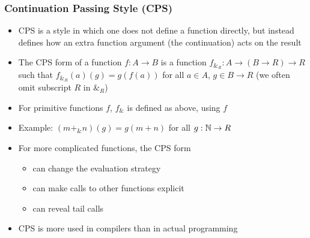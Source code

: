 \documentclass[handout]{beamer}
\begin{document}
\frame
  {   
    \frametitle{Continuation Passing Style (CPS)}\label{Mon5:CPS}

 \begin{itemize}[<+->]
\item CPS is a style in which one does not define a function directly, but instead
defines how an extra function argument (the continuation) acts on the result
\item The CPS form of a function $f: A\to B$ is a function $f_{\&_R} : A\to(B\to R)\to R$
such that $f_{\&_R} (a)(g) = g(f(a))$ for all $a\in A$, $g\in B\to R$ 
(we often omit subscript $R$ in $\&_R$)
\item For primitive functions $f$, $f_\&$ is defined as above, using $f$
\item Example: $(m+_\& n)(g) = g(m+n)$ for all $g:\mathbb{N}\to R$
\item For more complicated functions, the CPS form
\begin{itemize}
    \item can change the evaluation strategy
    \item can make calls to other functions explicit
    \item can reveal tail calls
 \end{itemize}
\item CPS is more used in compilers than in actual programming
 \end{itemize}

 }
\end{document}

